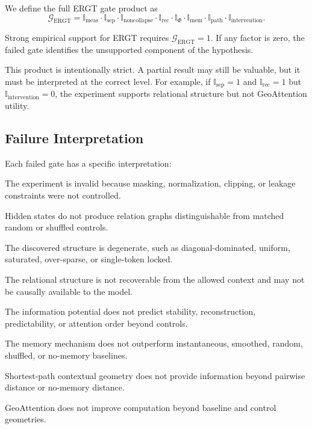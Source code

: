 \documentclass[11pt]{article}
\begin{document}
We define the full ERGT gate product as
\[
\mathcal{G}_{\mathrm{ERGT}}
=
\mathbb{I}_{\mathrm{meas}}
\cdot
\mathbb{I}_{\mathrm{sep}}
\cdot
\mathbb{I}_{\mathrm{noncollapse}}
\cdot
\mathbb{I}_{\mathrm{rec}}
\cdot
\mathbb{I}_{\Phi}
\cdot
\mathbb{I}_{\mathrm{mem}}
\cdot
\mathbb{I}_{\mathrm{path}}
\cdot
\mathbb{I}_{\mathrm{intervention}}.
\]

\begin{ergtclaim}
Strong empirical support for ERGT requires $\mathcal{G}_{\mathrm{ERGT}}=1$. If any factor is zero, the failed gate identifies the unsupported component of the hypothesis.
\end{ergtclaim}

This product is intentionally strict. A partial result may still be valuable, but it must be interpreted at the correct level. For example, if $\mathbb{I}_{\mathrm{sep}}=1$ and $\mathbb{I}_{\mathrm{rec}}=1$ but $\mathbb{I}_{\mathrm{intervention}}=0$, the experiment supports relational structure but not GeoAttention utility.

\subsection{Failure Interpretation}

Each failed gate has a specific interpretation:
\begin{description}[leftmargin=2.8em, style=nextline]
    \item[Measurement failure.] The experiment is invalid because masking, normalization, clipping, or leakage constraints were not controlled.
    \item[Separability failure.] Hidden states do not produce relation graphs distinguishable from matched random or shuffled controls.
    \item[Non-collapse failure.] The discovered structure is degenerate, such as diagonal-dominated, uniform, saturated, over-sparse, or single-token locked.
    \item[Reconstructibility failure.] The relational structure is not recoverable from the allowed context and may not be causally available to the model.
    \item[$\Phi$ failure.] The information potential does not predict stability, reconstruction, predictability, or attention order beyond controls.
    \item[Memory failure.] The memory mechanism does not outperform instantaneous, smoothed, random, shuffled, or no-memory baselines.
    \item[Path failure.] Shortest-path contextual geometry does not provide information beyond pairwise distance or no-memory distance.
    \item[Intervention failure.] GeoAttention does not improve computation beyond baseline and control geometries.
\end{description}
\end{document}

